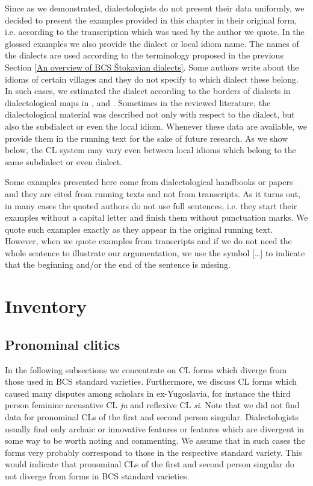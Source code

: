 Since as we demonstrated, dialectologists do not present their data uniformly, we decided to present the examples provided in this chapter in their original form, i.e. according to the transcription which was used by the author we quote. In the glossed examples we also provide the dialect or local idiom name. The names of the dialects are used according to the terminology proposed in the previous Section \ref{An overview of BCS Štokavian dialects}. Some authors write about the idioms of certain villages and they do not specify to which dialect these belong. In such cases, we estimated the dialect according to the borders of dialects in dialectological maps in \citet{IPR01}, \citet{Lisac03} and \citet{Okuka08}. Sometimes in the reviewed literature, the dialectological material was described not only with respect to the dialect, but also the subdialect or even the local idiom. Whenever these data are available, we provide them in the running text for the sake of future research. As we show below, the CL system may vary even between local idioms which belong to the same subdialect or even dialect. 

Some examples presented here come from dialectological handbooks or papers and they are cited from running texts and not from transcripts. As it turns out, in many cases the quoted authors do not use full sentences, i.e. they start their examples without a capital letter and finish them without punctuation marks. We quote such examples exactly as they appear in the original running text. However, when we quote examples from transcripts and if we do not need the whole sentence to illustrate our argumentation, we use the symbol [\dots] to indicate that the beginning and/or the end of the sentence is missing.

\section{Inventory}\label{Inventory:8}
\subsection{Pronominal clitics}

In the following subsections we concentrate on CL forms which diverge from those used in BCS standard varieties. Furthermore, we discuss CL forms which caused many disputes among scholars in ex-Yugoslavia, for instance the third person feminine accusative CL \textit{ju} and reflexive CL \textit{si}. Note that we did not find data for pronominal CLs of the first and second person singular. Dialectologists usually find only archaic or innovative features or features which are divergent in some way to be worth noting and commenting. We assume that in such cases the forms very probably correspond to those in the respective standard variety. This would indicate that pronominal CLs of the first and second person singular do not diverge from forms in BCS standard varieties.

